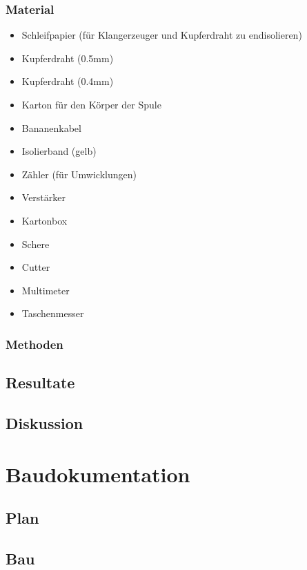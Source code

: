 \documentclass[a4paper,11pt]{report}
\begin{document}
\section{Material}
\begin{multicols}{2}
    \begin{itemize}[parsep=0pt]
        \item Schleifpapier (für Klangerzeuger und Kupferdraht zu endisolieren)
        \item Kupferdraht (0.5mm)
        \item Kupferdraht (0.4mm)
        \item Karton für den Körper der Spule
        \item Bananenkabel
        \item Isolierband (gelb)
        \item Zähler (für Umwicklungen)
        \item Verstärker
        \item Kartonbox
        \item Schere
        \item Cutter
        \item Multimeter
        \item Taschenmesser
    \end{itemize}
\end{multicols}
\section{Methoden}
\chapter{Resultate}
\chapter{Diskussion}

\part{Baudokumentation}

\chapter{Plan}

\chapter{Bau}

\newpage
\listoffigures

\newpage


\end{document}

